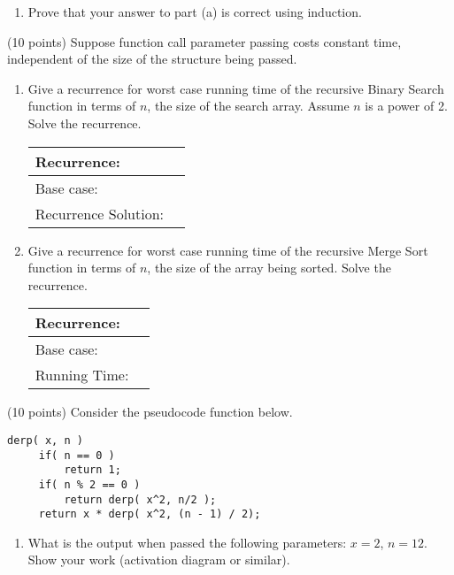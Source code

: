 \documentclass[11pt]{article}
\begin{document}
\begin{problems}
\begin{enumerate}
\item Prove that your answer to part (a) is correct using induction.
\vspace{1.5in}

\end{enumerate}

\item (10 points) Suppose function call parameter passing costs constant time, independent of the size of the structure being passed.

\begin{enumerate}
\item Give a recurrence for worst case 
running time of the recursive Binary Search function in terms of $n$, the size of the search array. Assume $n$ is a power of 2. Solve the recurrence.
\vspace{1.25in}
\begin{table}[!h] \flushright \renewcommand{\arraystretch}{2}  \begin{tabular}{|l|c| } \hline
Recurrence: & \hspace{2in} \\
\hline
Base case: & \\
\hline
Recurrence Solution: &  \\
\hline \end{tabular} \end{table}
\item Give a recurrence for worst case 
running time of the recursive Merge Sort function in terms of $n$, the size of the array being sorted. Solve the recurrence. 
\vspace{1.25in}
\begin{table}[!h] \flushright \renewcommand{\arraystretch}{2}  \begin{tabular}{|l|c| } \hline
Recurrence: & \hspace{2in} \\
\hline
Base case: & \\
\hline
Running Time: &  \\
\hline \end{tabular} \end{table}
\end{enumerate}


\newpage
\item (10 points) Consider the pseudocode function below.
\begin{verbatim}
derp( x, n )
     if( n == 0 )
         return 1;
     if( n % 2 == 0 )
         return derp( x^2, n/2 );
     return x * derp( x^2, (n - 1) / 2);
\end{verbatim}
\begin{enumerate}
\item What is the output when passed the following parameters: $x=2$, 
$n=12$. Show your work (activation diagram or similar).


\end{enumerate}
\end{problems}
\end{document}
